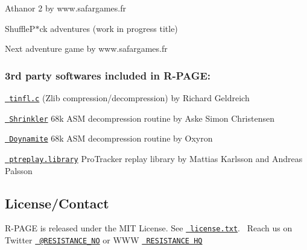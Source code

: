 \begin{DoxyItemize}
\item Athanor 2 by www.\+safargames.\+fr
\item Shuffle\+P$\ast$ck adventures (work in progress title)
\item Next adventure game by www.\+safargames.\+fr
\end{DoxyItemize}

\subsubsection*{3rd party softwares included in R-\/\+P\+A\+GE\+:}


\begin{DoxyItemize}
\item \href{https://github.com/richgel999/miniz}{\texttt{ tinfl.\+c}} (Zlib compression/decompression) by Richard Geldreich
\item \href{https://github.com/askeksa/Shrinkler}{\texttt{ Shrinkler}} 68k A\+SM decompression routine by Aske Simon Christensen
\item \href{https://github.com/AxisOxy/Planet-Rocklobster}{\texttt{ Doynamite}} 68k A\+SM decompression routine by Oxyron
\item \href{http://aminet.net/package/mus/play/ptreplay66}{\texttt{ ptreplay.\+library}} Pro\+Tracker replay library by Mattias Karlsson and Andreas Palsson
\end{DoxyItemize}

\subsection*{License/\+Contact}

R-\/\+P\+A\+GE is released under the M\+IT License. See \href{license.txt}{\texttt{ license.\+txt}}.~\newline
 Reach us on Twitter \href{https://twitter.com/RESISTANCE_NO}{\texttt{ @\+R\+E\+S\+I\+S\+T\+A\+N\+C\+E\+\_\+\+NO}} or W\+WW \href{https://resistance.no/}{\texttt{ R\+E\+S\+I\+S\+T\+A\+N\+CE HQ}} 